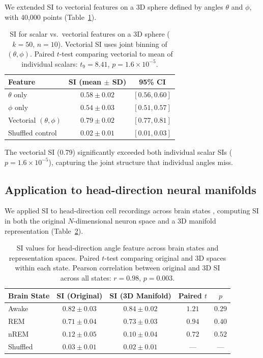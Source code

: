 \documentclass[11pt]{article}
\begin{document}
We extended SI to vectorial features on a 3D sphere defined by angles $\theta$ and $\phi$, with 40{,}000 points (Table~\ref{tab:vectorial}).

\begin{table}[H]
\centering
\caption{SI for scalar vs.\ vectorial features on a 3D sphere ($k = 50$, $n = 10$). Vectorial SI uses joint binning of $(\theta, \phi)$. Paired $t$-test comparing vectorial to mean of individual scalars: $t_{9} = 8.41$, $p = 1.6 \times 10^{-5}$.}
\label{tab:vectorial}
\begin{tabular}{lcc}
\toprule
\textbf{Feature} & \textbf{SI (mean $\pm$ SD)} & \textbf{95\% CI} \\
\midrule
$\theta$ only & $0.58 \pm 0.02$ & $[0.56, 0.60]$ \\
$\phi$ only & $0.54 \pm 0.03$ & $[0.51, 0.57]$ \\
Vectorial $(\theta, \phi)$ & $\mathbf{0.79 \pm 0.02}$ & $[0.77, 0.81]$ \\
Shuffled control & $0.02 \pm 0.01$ & $[0.01, 0.03]$ \\
\bottomrule
\end{tabular}
\end{table}

The vectorial SI (0.79) significantly exceeded both individual scalar SIs ($p = 1.6 \times 10^{-5}$), capturing the joint structure that individual angles miss.

\subsection{Application to head-direction neural manifolds}

We applied SI to head-direction cell recordings across brain states \citep{peyrache2015internally, chaudhuri2019intrinsic}, computing SI in both the original $N$-dimensional neuron space and a 3D manifold representation (Table~\ref{tab:neural}).

\begin{table}[H]
\centering
\caption{SI values for head-direction angle feature across brain states and representation spaces. Paired $t$-test comparing original and 3D spaces within each state. Pearson correlation between original and 3D SI across all states: $r = 0.98$, $p = 0.003$.}
\label{tab:neural}
\begin{tabular}{lcccc}
\toprule
\textbf{Brain State} & \textbf{SI (Original)} & \textbf{SI (3D Manifold)} & \textbf{Paired $t$} & \textbf{$p$} \\
\midrule
Awake & $0.82 \pm 0.03$ & $0.84 \pm 0.02$ & $1.21$ & $0.29$ \\
REM & $0.71 \pm 0.04$ & $0.73 \pm 0.03$ & $0.94$ & $0.40$ \\
nREM & $0.12 \pm 0.05$ & $0.10 \pm 0.04$ & $0.72$ & $0.52$ \\
Shuffled & $0.03 \pm 0.01$ & $0.02 \pm 0.01$ & --- & --- \\
\bottomrule
\end{tabular}
\end{table}
\end{document}
